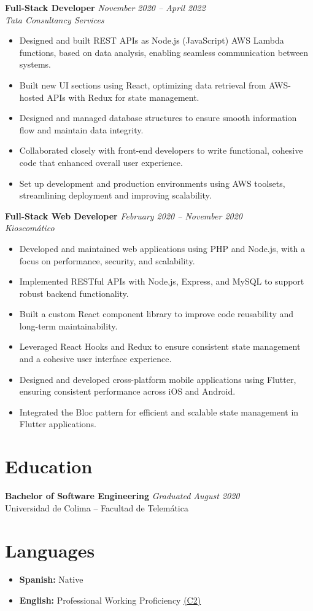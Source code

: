 \documentclass[10pt,letterpaper]{article}
\begin{document}
\vspace{1pt}
\textbf{Full-Stack Developer} \hfill \textit{November 2020 -- April 2022}\\
\textit{Tata Consultancy Services}
\begin{itemize}
    \item Designed and built REST APIs as Node.js (JavaScript) AWS Lambda functions, based on data analysis, enabling seamless communication between systems.
    \item Built new UI sections using React, optimizing data retrieval from AWS-hosted APIs with Redux for state management.
    \item Designed and managed database structures to ensure smooth information flow and maintain data integrity.
    \item Collaborated closely with front-end developers to write functional, cohesive code that enhanced overall user experience.
    \item Set up development and production environments using AWS toolsets, streamlining deployment and improving scalability.
\end{itemize}

\vspace{1pt}
\textbf{Full-Stack Web Developer} \hfill \textit{February 2020 -- November 2020}\\
\textit{Kioscomático}
\begin{itemize}
    \item Developed and maintained web applications using PHP and Node.js, with a focus on performance, security, and scalability.
    \item Implemented RESTful APIs with Node.js, Express, and MySQL to support robust backend functionality.
    \item Built a custom React component library to improve code reusability and long-term maintainability.
    \item Leveraged React Hooks and Redux to ensure consistent state management and a cohesive user interface experience.
    \item Designed and developed cross-platform mobile applications using Flutter, ensuring consistent performance across iOS and Android.
    \item Integrated the Bloc pattern for efficient and scalable state management in Flutter applications.
\end{itemize}

\section*{Education}
\textbf{Bachelor of Software Engineering} \hfill \textit{Graduated August 2020}\\
Universidad de Colima -- Facultad de Telemática

\section*{Languages}
\begin{itemize}
    \item \textbf{Spanish:} Native
    \item \textbf{English:} Professional Working Proficiency \href{https://cert.efset.org/en/SdWPH8}{(C2)}
\end{itemize}
\end{document}
